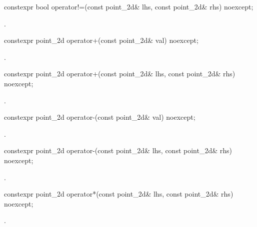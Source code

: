 %
\begin{itemdecl}
constexpr bool operator!=(const point_2d& lhs, const point_2d& rhs) noexcept;
\end{itemdecl}
\begin{itemdescr}
\pnum
\returns
{}.
\end{itemdescr}

%
\begin{itemdecl}
constexpr point_2d operator+(const point_2d& val) noexcept;
\end{itemdecl}
\begin{itemdescr}
\pnum
\returns
{}.
\end{itemdescr}

%
\begin{itemdecl}
constexpr point_2d operator+(const point_2d& lhs, const point_2d& rhs) 
  noexcept;
\end{itemdecl}
\begin{itemdescr}
\pnum
\returns
{}.
\end{itemdescr}

%
\begin{itemdecl}
constexpr point_2d operator-(const point_2d& val) noexcept;
\end{itemdecl}
\begin{itemdescr}
\pnum
\returns
{}.
\end{itemdescr}

%
\begin{itemdecl}
constexpr point_2d operator-(const point_2d& lhs, const point_2d& rhs) 
  noexcept;
\end{itemdecl}
\begin{itemdescr}
\pnum
\returns
{}.
\end{itemdescr}

%
\begin{itemdecl}
constexpr point_2d operator*(const point_2d& lhs, const point_2d& rhs) 
  noexcept;
\end{itemdecl}
\begin{itemdescr}
\pnum
\returns
{}.
\end{itemdescr}

